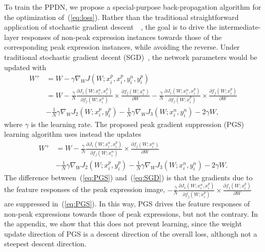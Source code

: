 \documentclass[runningheads]{llncs}
\begin{document}
To train the PPDN, we propose a special-purpose back-propagation algorithm 
 for the optimization of~(\ref{eq:loss}). Rather than the traditional 
straightforward application of stochastic gradient 
descent~\cite{chopra2005learning}~\cite{schroff2015facenet}, the goal is to 
drive the intermediate-layer responses of non-peak expression instances 
towards those of the corresponding peak expression instances, while avoiding 
the reverse. Under traditional stochastic gradient decent 
(SGD)~\cite{bottou2010large}, the network parameters would be updated
with
\begin{equation}
\begin{split}
W^{+} &= W - \gamma \nabla_W J(W; x^p_{i},x^p_{i},y^n_{i},y^p_i)\\
  &= W -\frac{\gamma}{N}\frac{\partial J_{1}(W; x^n_{i},x^p_{i})}{\partial f_{j}(W;x^n_{i})}\times\frac{\partial f_{j}(W;x^n_{i})}{\partial W} - \frac{\gamma
}{N}\frac{\partial J_{1}(W; x^n_{i},x^p_{i})}{\partial f_{j}(W;x^p_{i})}\times\frac{\partial f_{j}(W;x^p_{i})}{\partial W} \\
 & - \frac{1}{N}\gamma \nabla_W J_{2}(W; x^p_{i},y^p_{i})
 - \frac{1}{N}\gamma \nabla_W J_{3}(W;x^n_{i},y^n_{i})
  - 2\gamma W,
\label{eq:SGD}
\end{split}
\end{equation}
where $\gamma$ is the learning rate. The proposed
peak gradient suppression (PGS) learning algorithm
uses instead the updates
 \begin{equation}
 \begin{split}
W^{+} 
  &= W -\frac{\gamma}{N}\frac{\partial J_{1}(W; x^n_{i},x^p_{i})}{\partial f_{j}(W;x^n_{i})}\times\frac{\partial f_{j}(W;x^n_{i})}{\partial W}  \\
 & - \frac{1}{N}\gamma \nabla_W J_{2}(W; x^p_{i},y^p_{i})
 - \frac{1}{N}\gamma \nabla_W J_{3}(W;x^n_{i},y^n_{i})
  - 2\gamma W.
 \label{eq:PGS}
 \end{split}
 \end{equation}
The difference between~(\ref{eq:PGS}) and~(\ref{eq:SGD}) is that the 
gradients due to the feature responses of the peak expression image, 
$-\frac{\gamma}{N}\frac{\partial J_{1}(W; x^n_{i},x^p_{i})}{\partial f_{j}(W;x^p_{i})}\times\frac{\partial f_{j}(W;x^p_{i})}{\partial W}$ are suppressed 
in~(\ref{eq:PGS}). In this way, PGS drives the feature responses of
non-peak expressions towards those of peak expressions, but not the
contrary. In the appendix, we show that this does not prevent learning,
since the weight update direction of PGS  is a descent direction of
the overall loss, although not a steepest descent direction.
\end{document}

